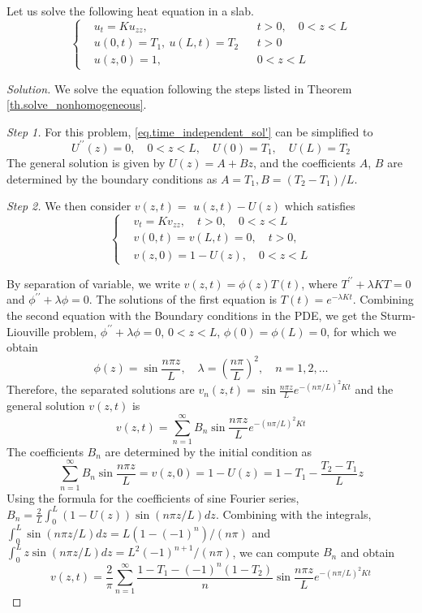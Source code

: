 \begin{example}
    Let us solve the following heat equation in a slab.
    \begin{equation}
        \left\{
        \begin{aligned}
            &u_t=K u_{z z},\quad && t>0, \quad 0<z<L \\
            &u(0, t)=T_1,\ u(L, t)=T_2 && t>0 \\
            &u(z, 0)=1,\quad && 0<z<L
        \end{aligned}
        \right.
    \end{equation}
\end{example}
\begin{proof}[Solution] We solve the equation following the steps listed in Theorem \ref{th.solve_nonhomogeneous}.

\textit{Step 1.} For this problem, \eqref{eq.time_independent_sol'} can be simplified to 
$$
U^{\prime \prime}(z)=0, \quad 0<z<L, \quad U(0)=T_1, \quad U(L)=T_2
$$
The general solution is given by $U(z)=A+Bz$, and the coefficients $A$, $B$ are determined by the boundary conditions as $A=T_1, B=(T_2-T_1)/L$. 
    
\textit{Step 2.} We then consider $v(z, t)=$ $u(z, t)-U(z)$ which satisfies
    $$
    \left\{\begin{aligned}
        & v_t=K v_{z z}, \quad t>0, \quad 0<z<L 
        \\
        & v(0, t)=v(L, t)=0, \quad t>0, 
        \\
        &v(z, 0)=1-U(z), \quad 0<z<L
        \end{aligned}\right.
    $$

By separation of variable, we write $v(z, t)=\phi(z) T(t)$, where $T^{\prime \prime}+\lambda K T=0$ and $\phi^{\prime \prime}+\lambda \phi=0$. The solutions of the first equation is $T(t)=e^{-\lambda K t}$. Combining the second equation with the Boundary conditions in the PDE, we get the Sturm-Liouville problem, $\phi^{\prime \prime}+\lambda \phi=0$, $0<z<L$, $\phi(0)=\phi(L)=0$, for which we obtain
    $$
    \phi(z)=\sin \frac{n \pi z}{L}, \quad \lambda=\left(\frac{n \pi}{L}\right)^2, \quad n=1,2, \ldots
    $$
Therefore, the separated solutions are $v_n(z, t)=\sin \frac{n \pi z}{L} e^{-(n \pi / L)^2 K t}$ and the general solution $v(z, t)$ is
    $$
    v(z, t)=\sum_{n=1}^{\infty} B_n \sin \frac{n \pi z}{L} e^{-(n \pi / L)^2 K t}
    $$
The coefficients $B_n$ are determined by the initial condition as    
    $$
    \sum_{n=1}^{\infty} B_n \sin \frac{n \pi z}{L} = v(z, 0)=1-U(z)=1-T_1-\frac{T_2-T_1}{L} z
    $$
Using the formula for the coefficients of sine Fourier series, $B_n = \frac{2}{L}\int_0^L (1-U(z))\sin (n \pi z / L) d z$. Combining with the integrals, $\int_0^L \sin (n \pi z / L) d z=L\left(1-(-1)^n\right) /(n \pi)$ and $\int_0^L z \sin (n \pi z / L) d z=L^2(-1)^{n+1} /(n \pi)$, we can compute $B_n$ and obtain
    $$
    v(z, t)=\frac{2}{\pi} \sum_{n=1}^{\infty} \frac{1-T_1-(-1)^n\left(1-T_2\right)}{n} \sin \frac{n \pi z}{L} e^{-(n \pi / L)^2 K t}
    $$ 


\end{proof}
